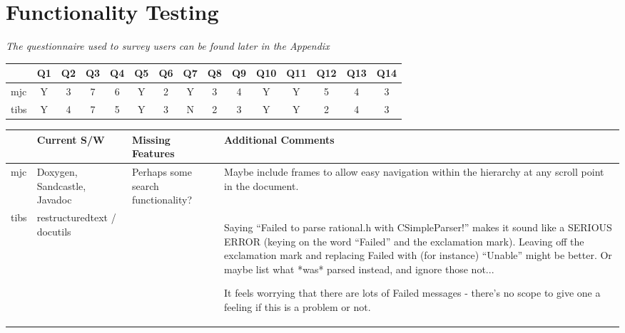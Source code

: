 

\section{Functionality Testing}
\emph{The questionnaire used to survey users can be found later in the
Appendix}

\begin{center}
\begin{tabular}{l || c | c | c | c | c | c | c | c | c | c | c | c | c | c}
     & Q1 & Q2 & Q3 & Q4 & Q5 & Q6 & Q7 & Q8 & Q9 & Q10 & Q11 & Q12 & Q13 & Q14 \\
\hline
mjc  & Y  & 3  & 7  & 6  & Y  & 2  & Y  & 3  & 4  & Y   & Y   & 5   & 4   & 3   \\
tibs & Y  & 4  & 7  & 5  & Y  & 3  & N  & 2  & 3  & Y   & Y   & 2   & 4   & 3   \\
\end{tabular}
\end{center}

\begin{landscape}
\begin{center}
\begin{tabular}{l || p{3cm} | p{4cm} | p{10cm}}
       & Current S/W & Missing Features & Additional Comments \\
\hline
  mjc  & Doxygen, Sandcastle, Javadoc & Perhaps some search functionality? &
    Maybe include frames to allow easy navigation within the hierarchy at any
    scroll point in the document. \\
\hline
  tibs & restructuredtext / docutils & &
    Saying ``Failed to parse rational.h with CSimpleParser!'' makes it sound
    like a SERIOUS ERROR (keying on the word ``Failed'' and the exclamation
    mark). Leaving off the exclamation mark and replacing Failed with (for
    instance) ``Unable'' might be better. Or maybe list what *was* parsed
    instead, and ignore those not...

    It feels worrying that there are lots of Failed messages - there's no
    scope to give one a feeling if this is a problem or not. \\
\end{tabular}
\end{center}
\end{landscape}
